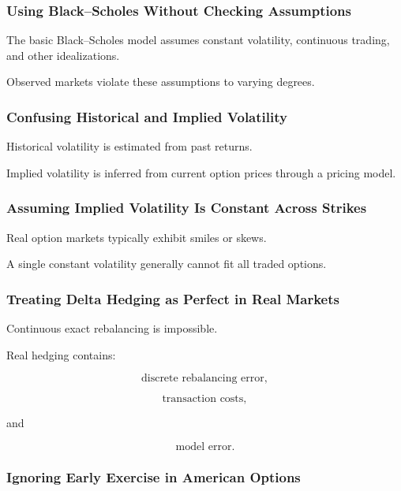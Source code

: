 \subsubsection{Using Black--Scholes Without Checking Assumptions}

The basic Black--Scholes model assumes constant volatility, continuous
trading, and other idealizations.

Observed markets violate these assumptions to varying degrees.

\subsubsection{Confusing Historical and Implied Volatility}

Historical volatility is estimated from past returns.

Implied volatility is inferred from current option prices through a pricing
model.

\subsubsection{Assuming Implied Volatility Is Constant Across Strikes}

Real option markets typically exhibit smiles or skews.

A single constant volatility generally cannot fit all traded options.

\subsubsection{Treating Delta Hedging as Perfect in Real Markets}

Continuous exact rebalancing is impossible.

Real hedging contains:

\[
\boxed{
\text{discrete rebalancing error},
}
\]

\[
\boxed{
\text{transaction costs},
}
\]

and

\[
\boxed{
\text{model error}.
}
\]

\subsubsection{Ignoring Early Exercise in American Options}

